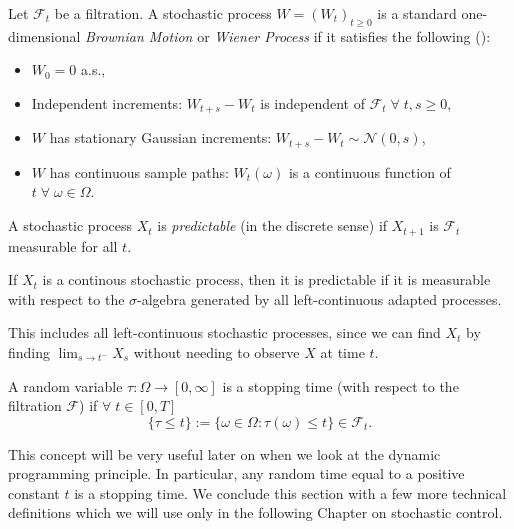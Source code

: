 \begin{definition}
    Let $\mathcal{F}_t$ be a filtration. A stochastic process $W=(W_t)_{t\geq0}$
    is a standard one-dimensional \emph{Brownian Motion} or \emph{Wiener Process}
    if it satisfies the following (\cite{BMSC}):
    \begin{itemize}
        \item $W_0=0$ a.s.,
        \item Independent increments: $W_{t+s}-W_t$ is independent of $\mathcal{F}_t\;\forall\;t,s\geq0$,
        \item $W$ has stationary Gaussian increments: $W_{t+s}-W_t\sim\mathcal{N}(0,s)$,
        \item $W$ has continuous sample paths: $W_t(\omega)$ is a continuous function of $t\;\forall\;\omega\in\Omega$.
    \end{itemize}
\end{definition}

\begin{definition}
    A stochastic process $X_t$ is \emph{predictable} (in the discrete sense) 
    if $X_{t+1}$ is $\mathcal{F}_{t}$ measurable for all $t$. 
    
    If $X_t$ is a continous stochastic process, then it is predictable if it is 
    measurable with respect to the $\sigma$-algebra generated by all left-continuous
    adapted processes. 
    
    This includes all left-continuous stochastic processes, 
    since we can find $X_t$ by finding $\lim_{s\rightarrow t^-}X_s$ without needing 
    to observe $X$ at time $t$.
\end{definition}

\begin{definition}
    A random variable $\tau:\Omega\rightarrow[0,\infty]$ is a stopping time (with
    respect to the filtration $\mathcal{F}$) if $\forall\;t\in[0,T]$
    \begin{equation}
        \{\tau\leq t\}:=\{\omega\in\Omega:\tau(\omega)\leq t\}\in\mathcal{F}_t.
    \end{equation}
\end{definition}

This concept will be very useful later on when we look at the dynamic programming 
principle. In particular, any random time equal to a positive constant $t$ is a 
stopping time. We conclude this section with a few more technical definitions which 
we will use only in the following Chapter on stochastic control.

